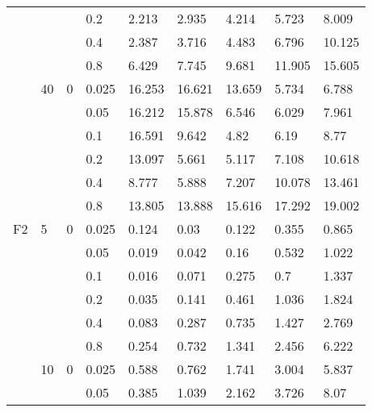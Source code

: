 \begin{longtable}{|l|l|l|l|l|l|l|l|l|}
\cmidrule{4-9} &     &          & 0.2            & 2.213      & 2.935      & 4.214      & 5.723      & 8.009      \\
\cmidrule{4-9} &     &          & 0.4            & 2.387      & 3.716      & 4.483      & 6.796      & 10.125     \\
\cmidrule{4-9} &     &          & 0.8            & 6.429      & 7.745      & 9.681      & 11.905     & 15.605     \\
\cmidrule{2-9} & 40  & 0        & 0.025          & 16.253     & 16.621     & 13.659     & 5.734      & 6.788      \\
\cmidrule{4-9} &     &          & 0.05           & 16.212     & 15.878     & 6.546      & 6.029      & 7.961      \\
\cmidrule{4-9} &     &          & 0.1            & 16.591     & 9.642      & 4.82       & 6.19       & 8.77       \\
\cmidrule{4-9} &     &          & 0.2            & 13.097     & 5.661      & 5.117      & 7.108      & 10.618     \\
\cmidrule{4-9} &     &          & 0.4            & 8.777      & 5.888      & 7.207      & 10.078     & 13.461     \\
\cmidrule{4-9} &     &          & 0.8            & 13.805     & 13.888     & 15.616     & 17.292     & 19.002     \\ \midrule
F2             & 5   & 0        & 0.025          & 0.124      & 0.03       & 0.122      & 0.355      & 0.865      \\
\cmidrule{4-9} &     &          & 0.05           & 0.019      & 0.042      & 0.16       & 0.532      & 1.022      \\
\cmidrule{4-9} &     &          & 0.1            & 0.016      & 0.071      & 0.275      & 0.7        & 1.337      \\
\cmidrule{4-9} &     &          & 0.2            & 0.035      & 0.141      & 0.461      & 1.036      & 1.824      \\
\cmidrule{4-9} &     &          & 0.4            & 0.083      & 0.287      & 0.735      & 1.427      & 2.769      \\
\cmidrule{4-9} &     &          & 0.8            & 0.254      & 0.732      & 1.341      & 2.456      & 6.222      \\
\cmidrule{2-9} & 10  & 0        & 0.025          & 0.588      & 0.762      & 1.741      & 3.004      & 5.837      \\
\cmidrule{4-9} &     &          & 0.05           & 0.385      & 1.039      & 2.162      & 3.726      & 8.07       \\

\end{longtable}
